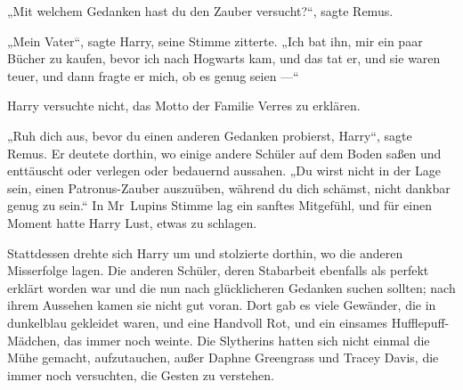 „Mit welchem Gedanken hast du den Zauber versucht?“, sagte Remus.

„Mein Vater“, sagte Harry, seine Stimme zitterte.
„Ich bat ihn, mir ein paar Bücher zu kaufen, bevor ich nach Hogwarts kam, und das tat er, und sie waren teuer, und dann fragte er mich, ob es genug seien —“

Harry versuchte nicht, das Motto der Familie Verres zu erklären.

„Ruh dich aus, bevor du einen anderen Gedanken probierst, Harry“, sagte Remus. Er deutete dorthin, wo einige andere Schüler auf dem Boden saßen und enttäuscht oder verlegen oder bedauernd aussahen.
„Du wirst nicht in der Lage sein, einen Patronus-Zauber auszuüben, während du dich schämst, nicht dankbar genug zu sein.“ In Mr~Lupins Stimme lag ein sanftes Mitgefühl, und für einen Moment hatte Harry Lust, etwas zu schlagen.

Stattdessen drehte sich Harry um und stolzierte dorthin, wo die anderen Misserfolge lagen. Die anderen Schüler, deren Stabarbeit ebenfalls als perfekt erklärt worden war und die nun nach glücklicheren Gedanken suchen sollten; nach ihrem Aussehen kamen sie nicht gut voran. Dort gab es viele Gewänder, die in dunkelblau gekleidet waren, und eine Handvoll Rot, und ein einsames Hufflepuff-Mädchen, das immer noch weinte. Die Slytherins hatten sich nicht einmal die Mühe gemacht, aufzutauchen, außer Daphne Greengrass und Tracey Davis, die immer noch versuchten, die Gesten zu verstehen.

